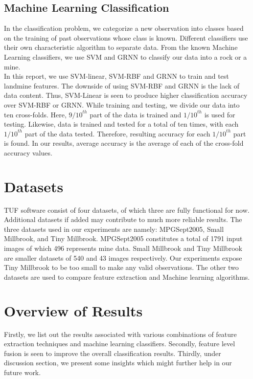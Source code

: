 \documentclass[english, 12pt]{article}
\begin{document}
\subsection{Machine Learning Classification}
\tab In the classification problem, we categorize a new observation into classes based on the training of past observations whose class is known. Different classifiers use their own characteristic algorithm to separate data. From the known Machine Learning classifiers, we use SVM and GRNN to classify our data into a rock or a mine.
\\ 
\tab In this report, we use SVM-linear, SVM-RBF and GRNN to train and test landmine features. The downside of using SVM-RBF and GRNN is the lack of data content. Thus, SVM-Linear is seen to produce higher classification accuracy over SVM-RBF or GRNN. While training and testing, we divide our data into ten cross-folds. Here, ${9/10}^{th}$ part of the data is trained and ${1/10}^{th}$ is used for testing. Likewise, data is trained and tested for a total of ten times, with each ${1/10}^{th}$ part of the data tested. Therefore, resulting accuracy for each ${1/10}^{th}$ part is found. In our results, average accuracy is the average of each of the cross-fold accuracy values.


\section{Datasets}
\tab TUF software consist of four datasets, of which three are fully functional for now. Additional datasets if added may contribute to much more reliable results. The three datasets used in our experiments are namely: MPGSept2005, Small Millbrook, and Tiny Millbrook. MPGSept2005 constitutes a total of 1791 input images of which 496 represents mine data. Small Millbrook and Tiny Millbrook are smaller datasets of  540 and 43 images respectively. Our experiments expose Tiny Millbrook to be too small to make any valid observations. The other two datasets are used to compare feature extraction and Machine learning algorithms. 

\section{Overview of Results}
\tab Firstly, we list out the results associated with various combinations of feature extraction techniques and machine learning classifiers. Secondly, feature level fusion is seen to improve the overall classification results. Thirdly, under discussion section, we present some insights which might further help in our future work. 
\end{document}
